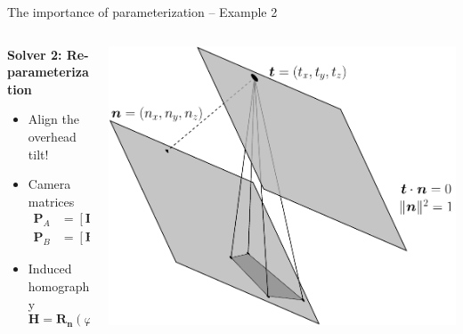 \documentclass[aspectratio=169]{beamer}
\renewcommand{\phi}{\varphi}
\newcommand{\mat}[1]{\bm{#1}}
\newcommand{\T}{T}
\begin{document}
\begin{frame}[t]{The importance of parameterization -- Example 2}
\begin{columns}
    \begin{column}{0.5\textwidth}
        \begin{minipage}[t][\textheight][t]{\textwidth}
        \theimportanceTwoHeight
        \textbf{Solver 2: Re-parameterization}

        \begin{itemize}
            \item Align the overhead tilt!
            \item Camera matrices
            \[
                \begin{aligned}
                    \mat{P}_A &= [\mat{I}\,|\,\mat{0}], \\
                    \mat{P}_B &= [\mat{R}_{\mat{n}}(\phi)\,|\,-\mat{t}]
                \end{aligned}
            \]
            \item Induced homography
            \begin{equation*}\label{paper03:eq:h}
                \mat{H}= \mat{R}_{\mat{n}}(\phi)+\mat{t}\mat{n}^{ \T}\;.
            \end{equation*}
        \end{itemize}
        \end{minipage}
    \end{column}%
    \begin{column}{0.5\textwidth}
        \centering
        \includegraphics[width=\linewidth]{../lecture_notes/images/prob_geom1b.pdf}
    \end{column}
\end{columns}
\end{frame}
\end{document}

